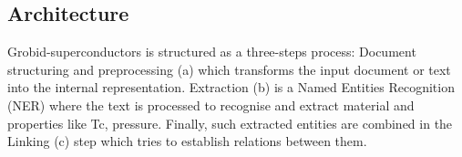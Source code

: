\documentclass{article}
\begin{document}



\subsection{Architecture}

Grobid-superconductors is structured as a three-steps process: Document structuring and preprocessing (a) which transforms the input document or text into the internal representation. Extraction (b) is a Named Entities Recognition (NER) where the text is processed to recognise and extract material and properties like Tc, pressure. Finally, such extracted entities are combined in the Linking (c) step which tries to establish relations between them. 
\end{document}
